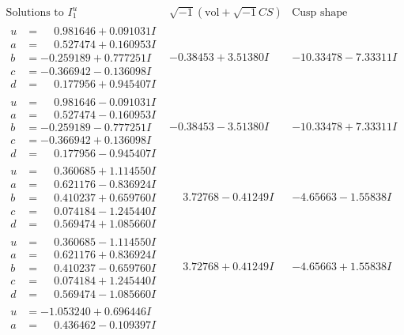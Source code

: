 \documentclass[1p]{elsarticle_modified}
\theoremstyle{definition}
\newcommand{\I}{\sqrt{-1}}
\begin{document}
$$\begin{array}{c|c|c}  
\text{Solutions to }I^u_{1}& \I (\text{vol} + \sqrt{-1}CS) & \text{Cusp shape}\\
 \hline 
\begin{aligned}
u &= \phantom{-}0.981646 + 0.091031 I \\
a &= \phantom{-}0.527474 + 0.160953 I \\
b &= -0.259189 + 0.777251 I \\
c &= -0.366942 - 0.136098 I \\
d &= \phantom{-}0.177956 + 0.945407 I\end{aligned}
 & -0.38453 + 3.51380 I & -10.33478 - 7.33311 I \\ \hline\begin{aligned}
u &= \phantom{-}0.981646 - 0.091031 I \\
a &= \phantom{-}0.527474 - 0.160953 I \\
b &= -0.259189 - 0.777251 I \\
c &= -0.366942 + 0.136098 I \\
d &= \phantom{-}0.177956 - 0.945407 I\end{aligned}
 & -0.38453 - 3.51380 I & -10.33478 + 7.33311 I \\ \hline\begin{aligned}
u &= \phantom{-}0.360685 + 1.114550 I \\
a &= \phantom{-}0.621176 - 0.836924 I \\
b &= \phantom{-}0.410237 + 0.659760 I \\
c &= \phantom{-}0.074184 - 1.245440 I \\
d &= \phantom{-}0.569474 + 1.085660 I\end{aligned}
 & \phantom{-}3.72768 - 0.41249 I & -4.65663 - 1.55838 I \\ \hline\begin{aligned}
u &= \phantom{-}0.360685 - 1.114550 I \\
a &= \phantom{-}0.621176 + 0.836924 I \\
b &= \phantom{-}0.410237 - 0.659760 I \\
c &= \phantom{-}0.074184 + 1.245440 I \\
d &= \phantom{-}0.569474 - 1.085660 I\end{aligned}
 & \phantom{-}3.72768 + 0.41249 I & -4.65663 + 1.55838 I \\ \hline\begin{aligned}
u &= -1.053240 + 0.696446 I \\
a &= \phantom{-}0.436462 - 0.109397 I \\

\end{aligned}
\end{array}$$
\end{document}
